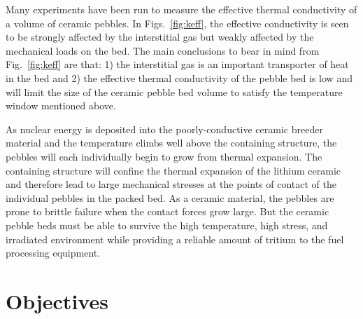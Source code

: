 Many experiments have been run to measure the effective thermal conductivity of a volume of ceramic pebbles. In Figs.~\ref{fig:keff}, the effective conductivity is seen to be strongly affected by the interstitial gas but weakly affected by the mechanical loads on the bed. The main conclusions to bear in mind from Fig.~\ref{fig:keff} are that: 1) the interstitial gas is an important transporter of heat in the bed and 2) the effective thermal conductivity of the pebble bed is low and will limit the size of the ceramic pebble bed volume to satisfy the temperature window mentioned above.


As nuclear energy is deposited into the poorly-conductive ceramic breeder material and the temperature climbs well above the containing structure, the pebbles will each individually begin to grow from thermal expansion. The containing structure will confine the thermal expansion of the lithium ceramic and therefore lead to large mechanical stresses at the points of contact of the individual pebbles in the packed bed. As a ceramic material, the pebbles are prone to brittle failure when the contact forces grow large. But the ceramic pebble beds must be able to survive the high temperature, high stress, and irradiated environment while providing a reliable amount of tritium to the fuel processing equipment.





\section{Objectives}

